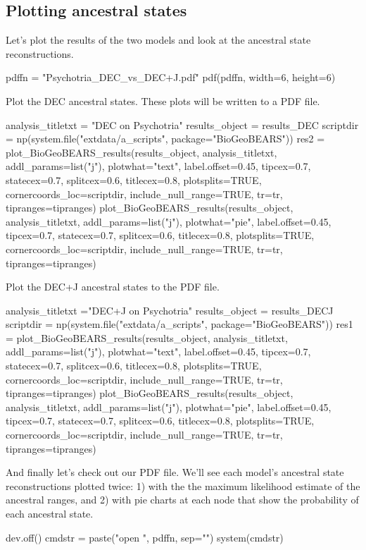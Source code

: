 \documentclass[11pt]{article}
\begin{document}
\subsection{Plotting ancestral states}

Let's plot the results of the two models and look at
the ancestral state reconstructions.
\begin{code}
pdffn = "Psychotria_DEC_vs_DEC+J.pdf"
pdf(pdffn, width=6, height=6)
\end{code}
Plot the DEC ancestral states. These plots will be written to a PDF file.
\begin{code}
analysis_titletxt = "DEC on Psychotria"
results_object = results_DEC
scriptdir = np(system.file("extdata/a_scripts", package="BioGeoBEARS"))
res2 = plot_BioGeoBEARS_results(results_object, analysis_titletxt, addl_params=list("j"), plotwhat="text", 
            label.offset=0.45, tipcex=0.7, statecex=0.7, splitcex=0.6, titlecex=0.8, plotsplits=TRUE, 
            cornercoords_loc=scriptdir, include_null_range=TRUE, tr=tr, tipranges=tipranges)
plot_BioGeoBEARS_results(results_object, analysis_titletxt, addl_params=list("j"), plotwhat="pie", 
            label.offset=0.45, tipcex=0.7, statecex=0.7, splitcex=0.6, titlecex=0.8, plotsplits=TRUE, 
            cornercoords_loc=scriptdir, include_null_range=TRUE, tr=tr, tipranges=tipranges)
\end{code}
Plot the DEC+J ancestral states to the PDF file.
\begin{code}
analysis_titletxt ="DEC+J on Psychotria"
results_object = results_DECJ
scriptdir = np(system.file("extdata/a_scripts", package="BioGeoBEARS"))
res1 = plot_BioGeoBEARS_results(results_object, analysis_titletxt, addl_params=list("j"), plotwhat="text", 
            label.offset=0.45, tipcex=0.7, statecex=0.7, splitcex=0.6, titlecex=0.8, plotsplits=TRUE, 
            cornercoords_loc=scriptdir, include_null_range=TRUE, tr=tr, tipranges=tipranges)
plot_BioGeoBEARS_results(results_object, analysis_titletxt, addl_params=list("j"), plotwhat="pie", 
            label.offset=0.45, tipcex=0.7, statecex=0.7, splitcex=0.6, titlecex=0.8, plotsplits=TRUE, 
            cornercoords_loc=scriptdir, include_null_range=TRUE, tr=tr, tipranges=tipranges)
\end{code}
And finally let's check out our PDF file. We'll see each model's ancestral
state reconstructions plotted twice: 1) with the
the maximum likelihood estimate of the ancestral ranges, and
2) with pie charts at each node that show the probability
of each ancestral state.
\begin{code}
dev.off()
cmdstr = paste("open ", pdffn, sep="")
system(cmdstr)
\end{code}
\end{document}
